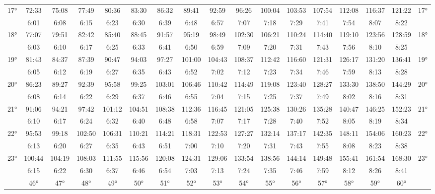 \begin{scriptsize}
\begin{tabular}{c || c | c | c | c | c | c | c | c | c | c | c | c | c | c | c || c}
		\multirow{2}{*}{17°}&72:33&75:08&77:49&80:36&83:30&86:32&89:41&92:59&96:26&100:04&103:53&107:54&112:08&116:37&121:22&\multirow{2}{*}{17°}\\ \space&6:01&6:08&6:15&6:23&6:30&6:39&6:48&6:57&7:07&7:18&7:29&7:41&7:54&8:07&8:22&\space\\\hline
		\multirow{2}{*}{18°}&77:07&79:51&82:42&85:40&88:45&91:57&95:19&98:49&102:30&106:21&110:24&114:40&119:10&123:56&128:59&\multirow{2}{*}{18°}\\ \space&6:03&6:10&6:17&6:25&6:33&6:41&6:50&6:59&7:09&7:20&7:31&7:43&7:56&8:10&8:25&\space\\\hline
		\multirow{2}{*}{19°}&81:43&84:37&87:39&90:47&94:03&97:27&101:00&104:43&108:37&112:42&116:60&121:31&126:17&131:20&136:41&\multirow{2}{*}{19°}\\ \space&6:05&6:12&6:19&6:27&6:35&6:43&6:52&7:02&7:12&7:23&7:34&7:46&7:59&8:13&8:28&\space\\\hline
		\multirow{2}{*}{20°}&86:23&89:27&92:39&95:58&99:25&103:01&106:46&110:42&114:49&119:08&123:40&128:27&133:30&138:50&144:29&\multirow{2}{*}{20°}\\ \space&6:08&6:14&6:22&6:29&6:37&6:46&6:55&7:04&7:15&7:25&7:37&7:49&8:02&8:16&8:31&\space\\\hline
		\multirow{2}{*}{21°}&91:06&94:21&97:42&101:12&104:51&108:38&112:36&116:45&121:05&125:38&130:26&135:28&140:47&146:25&152:23&\multirow{2}{*}{21°}\\ \space&6:10&6:17&6:24&6:32&6:40&6:48&6:58&7:07&7:17&7:28&7:40&7:52&8:05&8:19&8:34&\space\\\hline
		\multirow{2}{*}{22°}&95:53&99:18&102:50&106:31&110:21&114:21&118:31&122:53&127:27&132:14&137:17&142:35&148:11&154:06&160:23&\multirow{2}{*}{22°}\\ \space&6:13&6:20&6:27&6:35&6:43&6:51&7:00&7:10&7:20&7:31&7:43&7:55&8:08&8:23&8:38&\space\\\hline
		\multirow{2}{*}{23°}&100:44&104:19&108:03&111:55&115:56&120:08&124:31&129:06&133:54&138:56&144:14&149:48&155:41&161:54&168:30&\multirow{2}{*}{23°}\\ \space&6:15&6:22&6:30&6:37&6:46&6:54&7:03&7:13&7:24&7:35&7:46&7:59&8:12&8:26&8:41&\space\\\hline
		\hline\space &46°&47°&48°&49°&50°&51°&52°&53°&54°&55°&56°&57°&58°&59°&60°
\end{tabular}\end{scriptsize}

